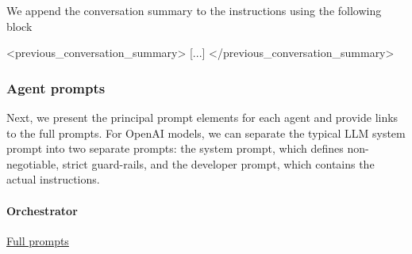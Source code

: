 \documentclass[submission, Phys]{SciPost}
\begin{document}
We append the conversation summary to the instructions using the following block
%
\begin{promptblocklit}
<previous_conversation_summary>
[...]
</previous_conversation_summary>
\end{promptblocklit}

\subsubsection*{Agent prompts}

Next, we present the principal prompt elements for each agent and provide links to the full prompts. For OpenAI models, we can separate the typical LLM system prompt into two separate prompts: the system prompt, which defines non-negotiable, strict guard-rails, and the developer prompt, which contains the actual instructions.

\paragraph{Orchestrator} \href{https://github.com/heidelberg-hepml/MadAgents/tree/main/supplementary/prompts/Orchestrator}{Full prompts}
\end{document}
